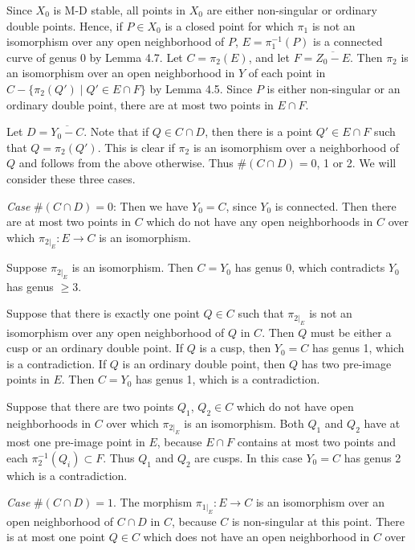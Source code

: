 \documentclass[12pt]{memoir}
\begin{document}
\begin{ptcbp}
Since $X_0$ is M-D stable, all points in $X_0$ are either non-singular or ordinary double points. Hence, if $P \in X_0$ is a closed point for which $\pi_1$ is not an isomorphism over any open neighborhood of $P$, $E = \pi_1^{-1}(P)$ is a connected curve of genus 0 by Lemma 4.7. Let $C = \pi_2(E)$, and let $F = \overline{Z_0 - E}$. Then $\pi_2$ is an isomorphism over an open neighborhood in $Y$ of each point in $C - \{\pi_2(Q') \mid Q' \in E \cap F\}$ by Lemma 4.5. Since $P$ is either non-singular or an ordinary double point, there are at most two points in $E \cap F$.

Let $D = \overline{Y_0 - C}$. Note that if $Q \in C \cap D$, then there is a point $Q' \in E \cap F$ such that $Q = \pi_2(Q')$. This is clear if $\pi_2$ is an isomorphism over a neighborhood of $Q$ and follows from the above otherwise. Thus $\#(C \cap D) = 0$, 1 or 2. We will consider these three cases.

\emph{Case} $\#(C \cap D) = 0$: Then we have $Y_0 = C$, since $Y_0$ is connected. Then there are at most two points in $C$ which do not have any open neighborhoods in $C$ over which $\pi_{2|_E}\colon E \to C$ is an isomorphism.

Suppose $\pi_{2|_E}$ is an isomorphism. Then $C = Y_0$ has genus 0, which contradicts $Y_0$ has genus $\geqslant 3$.

Suppose that there is exactly one point $Q \in C$ such that $\pi_{2|_E}$ is not an isomorphism over any open neighborhood of $Q$ in $C$. Then $Q$ must be either a cusp or an ordinary double point. If $Q$ is a cusp, then $Y_0 = C$ has genus 1, which is a contradiction. If $Q$ is an ordinary double point, then $Q$ has two pre-image points in $E$. Then $C = Y_0$ has genus 1, which is a contradiction.

Suppose that there are two points $Q_1$, $Q_2 \in C$ which do not have open neighborhoods in $C$ over which $\pi_{2|_E}$ is an isomorphism. Both $Q_1$ and $Q_2$ have at most one pre-image point in $E$, because $E \cap F$ contains at most two points and each $\pi_2^{-1}(Q_i) \subset F$. Thus $Q_1$ and $Q_2$ are cusps. In this case $Y_0 = C$ has genus 2 which is a contradiction.

\emph{Case} $\#(C \cap D) = 1$. The morphism $\pi_{1|_E}\colon E \to C$ is an isomorphism over an open neighborhood of $C \cap D$ in $C$, because $C$ is non-singular at this point. There is at most one point $Q \in C$ which does not have an open neighborhood in $C$ over


\end{ptcbp}
\end{document}
